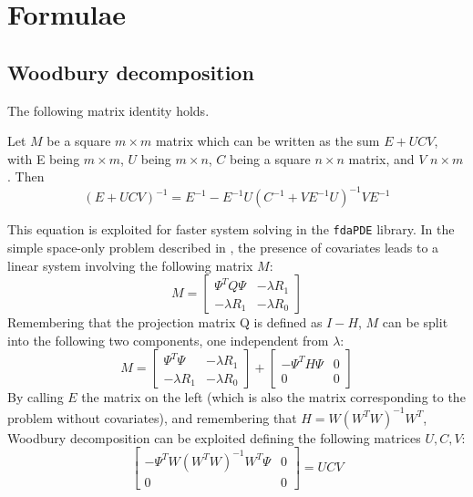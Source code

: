 \chapter{Formulae}
\section{Woodbury decomposition}
\label{sec:wood}
The following matrix identity holds.
\begin{proposition}
    Let $M$ be a square $m\times m$ matrix which can be written as the sum $E+UCV$, with E being $m \times m$, $U$ being $m\times n$, $C$ being a square $n\times n$ matrix, and $V$ $n\times m$. Then
    \begin{equation}
        \label{wood}
        \left(E + UCV \right)^{-1} = E^{-1} - E^{-1}U\left(C^{-1} + V E^{-1}U\right)^{-1}V E^{-1}
    \end{equation}
\end{proposition}
This equation is exploited for faster system solving in the \verb|fdaPDE| library.
In the simple space-only problem described \eg in \cite{sangalli}, the presence of covariates leads to a linear system involving the following matrix $M$:
\begin{equation*}
    M =
    \begin{bmatrix}
        \Psi^TQ\Psi & -\lambda R_1\\
        -\lambda R_1  & -\lambda R_0
    \end{bmatrix}
\end{equation*}
Remembering that the projection matrix Q is defined as $I-H$, $M$ can be split into the following two components, one independent from $\lambda$:
\begin{equation*}
    M =
    \begin{bmatrix}
        \Psi^T\Psi & -\lambda R_1\\
        -\lambda R_1  & -\lambda R_0
    \end{bmatrix}
    +
    \begin{bmatrix}
        -\Psi^TH\Psi & 0\\
        0 & 0
    \end{bmatrix}
\end{equation*}
By calling $E$ the matrix on the left (which is also the matrix corresponding to the problem without covariates), and remembering that $H = W\left(W^TW\right)^{-1}W^T$, Woodbury decomposition can be exploited defining the following matrices $U, C, V$:
\begin{equation*}     
    \begin{bmatrix}
        -\Psi^TW\left(W^TW\right)^{-1}W^T\Psi & 0\\
        0 & 0
    \end{bmatrix} = UCV
\end{equation*}
